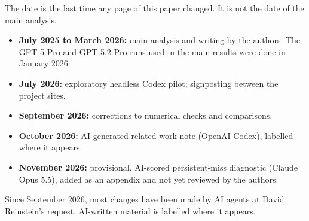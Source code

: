 \documentclass[
  11pt,
  letterpaper,
]{article}
\providecommand{\tightlist}{%
  \setlength{\itemsep}{0pt}\setlength{\parskip}{0pt}}
\begin{document}
\begin{tcolorbox}[enhanced jigsaw, colframe=quarto-callout-note-color-frame, breakable, rightrule=.15mm, toptitle=1mm, opacitybacktitle=0.6, opacityback=0, colback=white, bottomtitle=1mm, leftrule=.75mm, toprule=.15mm, coltitle=black, bottomrule=.15mm, titlerule=0mm, title=\textcolor{quarto-callout-note-color}{\faInfo}\hspace{0.5em}{What the date above means}, colbacktitle=quarto-callout-note-color!10!white, arc=.35mm, left=2mm]

The date is the last time any page of this paper changed. It is not the
date of the main analysis.

\begin{itemize}
\tightlist
\item
  \textbf{July 2025 to March 2026:} main analysis and writing by the
  authors. The GPT-5 Pro and GPT-5.2 Pro runs used in the main results
  were done in January 2026.
\item
  \textbf{July 2026:} exploratory headless Codex pilot; signposting
  between the project sites.
\item
  \textbf{September 2026:} corrections to numerical checks and
  comparisons.
\item
  \textbf{October 2026:} AI-generated related-work note (OpenAI Codex),
  labelled where it appears.
\item
  \textbf{November 2026:} provisional, AI-scored persistent-miss
  diagnostic (Claude Opus 5.5), added as an appendix and not yet
  reviewed by the authors.
\end{itemize}

Since September 2026, most changes have been made by AI agents at David
Reinstein's request. AI-written material is labelled where it appears.

\end{tcolorbox}
\end{document}
